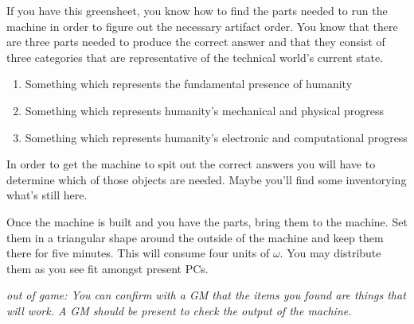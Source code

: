 \documentclass[green]{guildcamp3}
\begin{document}
\name{\gAddPartsTech{}}

If you have this greensheet, you know how to find the parts needed to run the machine in order to figure out the necessary artifact order. You know that there are three parts needed to produce the correct answer and that they consist of three categories that are representative of the technical world's current state. 

\begin{enumerate}
	\item Something which represents the fundamental presence of humanity
	\item Something which represents humanity's mechanical and physical progress
	\item Something which represents humanity's electronic and computational progress
\end{enumerate}

In order to get the machine to spit out the correct answers you will have to determine which of those objects are needed. Maybe you'll find some inventorying what's still here. 

Once the machine is built and you have the parts, bring them to the machine. Set them in a triangular shape around the outside of the machine and keep them there for five minutes. This will consume four units of $\omega$. You may distribute them as you see fit amongst present PCs.

\emph{out of game: You can confirm with a GM that the items you found are things that will work. A GM should be present to check the output of the machine.}

\end{document}
